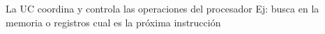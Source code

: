 \documentclass[preview]{standalone}
\begin{document}
La UC coordina y controla las operaciones del procesador
                            Ej: busca en la memoria o registros cual es la próxima instrucción\\
\end{document}
